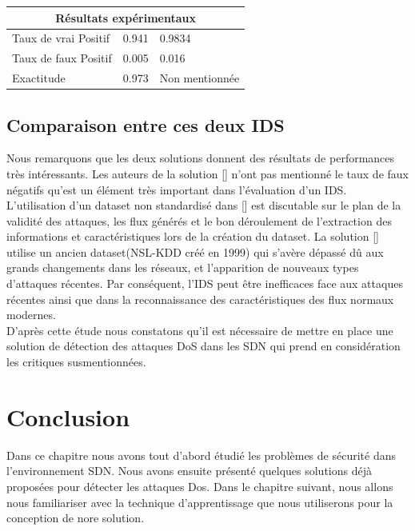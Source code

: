 \begin{tabular}{| m{4cm} | m{5cm} | m{5cm} |}
\multicolumn{3}{c}{Résultats expérimentaux}\\
\hline
Taux de vrai Positif & 0.941 & 0.9834\\
\hline
Taux de faux Positif & 0.005 & 0.016\\
\hline
Exactitude & 0.973 & Non mentionnée \\
\hline
\end{tabular}

\subsection{Comparaison entre ces deux IDS}
Nous remarquons que les deux solutions donnent des résultats de performances très intéressants. Les auteurs de la solution [\cite{11}] n’ont pas mentionné le taux de faux négatifs qu’est un élément très important dans l’évaluation d’un IDS. L’utilisation d’un dataset non standardisé dans [\cite{11}] est discutable sur le plan de la validité des attaques, les flux générés et le bon déroulement de l’extraction des informations et caractéristiques lors de la création du dataset. La solution [\cite{13}] utilise un ancien dataset(NSL-KDD créé en 1999) qui s’avère dépassé dû aux grands changements dans les réseaux, et l’apparition de nouveaux types d’attaques récentes. Par conséquent, l’IDS peut être inefficaces face aux attaques récentes ainsi que dans la reconnaissance des caractéristiques des flux normaux modernes.\\
D’après cette étude nous constatons qu’il est nécessaire de mettre en place une solution de détection des attaques DoS dans les SDN qui prend en considération les critiques susmentionnées. 

\section{Conclusion}
Dans ce chapitre nous avons tout d’abord étudié les problèmes de sécurité dans l’environnement SDN. Nous avons ensuite présenté quelques solutions déjà proposées pour détecter les attaques Dos. Dans le chapitre suivant, nous allons nous familiariser avec la technique d’apprentissage que nous utiliserons pour la conception de nore solution. 